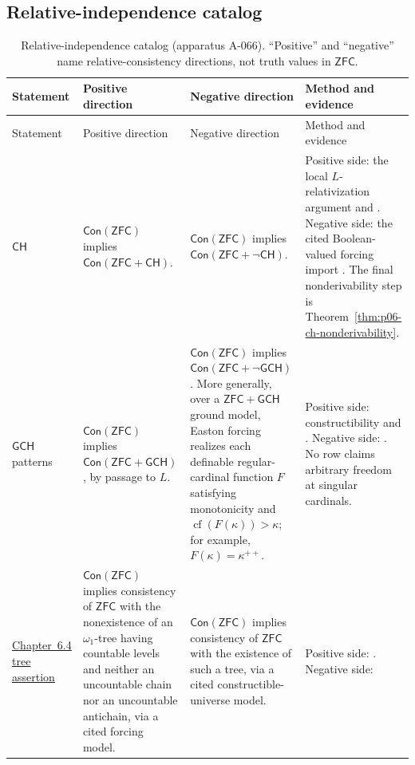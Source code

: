 \begin{landscape}
\subsection{Relative-independence catalog}
\small
\begin{longtable}{@{}p{.85in}p{1.95in}p{2.10in}p{2.10in}@{}}
\caption{Relative-independence catalog (apparatus A-066).  ``Positive'' and
``negative'' name relative-consistency directions, not truth values in
\(\mathsf{ZFC}\).}\label{tab:p06-independence-catalog}\\
\toprule
Statement & Positive direction & Negative direction & Method and evidence \\
\midrule
\endfirsthead
\toprule
Statement & Positive direction & Negative direction & Method and evidence \\
\midrule
\endhead
\(\mathsf{CH}\)
& \(\mathsf{Con}(\mathsf{ZFC})\) implies
  \(\mathsf{Con}(\mathsf{ZFC}+\mathsf{CH})\).
& \(\mathsf{Con}(\mathsf{ZFC})\) implies
  \(\mathsf{Con}(\mathsf{ZFC}+\neg\mathsf{CH})\).
& Positive side: the local \(L\)-relativization argument and
  \textcite{Godel1938}.  Negative side: the cited Boolean-valued forcing
  import \parencite{Cohen1963,Jech2003}.  The final nonderivability step is
  Theorem~\ref{thm:p06-ch-nonderivability}. \\
\addlinespace
\(\mathsf{GCH}\) patterns
& \(\mathsf{Con}(\mathsf{ZFC})\) implies
  \(\mathsf{Con}(\mathsf{ZFC}+\mathsf{GCH})\), by passage to \(L\).
& \(\mathsf{Con}(\mathsf{ZFC})\) implies
  \(\mathsf{Con}(\mathsf{ZFC}+\neg\mathsf{GCH})\).  More generally, over a
  \(\mathsf{ZFC}+\mathsf{GCH}\) ground model, Easton forcing realizes each
  definable regular-cardinal function \(F\) satisfying monotonicity and
  \(\operatorname{cf}(F(\kappa))>\kappa\); for example,
  \(F(\kappa)=\kappa^{++}\).
& Positive side: constructibility and \textcite{Godel1938}.  Negative side:
  \textcite{Easton1970}.  No row claims arbitrary freedom at singular
  cardinals. \\
\addlinespace
\hyperref[def:p06-suslin-hypothesis]{Chapter~6.4 tree assertion}
& \(\mathsf{Con}(\mathsf{ZFC})\) implies consistency of \(\mathsf{ZFC}\) with
  the nonexistence of an \(\omega_1\)-tree having countable levels and neither
  an uncountable chain nor an uncountable antichain, via a cited forcing model.
& \(\mathsf{Con}(\mathsf{ZFC})\) implies consistency of \(\mathsf{ZFC}\) with
  the existence of such a tree, via a cited constructible-universe model.
& Positive side: \textcite{MartinSolovay1970,Jech2003}.  Negative side:

\end{longtable}
\end{landscape}
